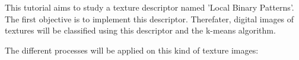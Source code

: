 \def\difficulty{1}
\begin{note}This tutorial aims to study a texture descriptor named 'Local Binary Patterns'. The first objective is to implement this descriptor. Therefater, digital images of textures will be classified using this descriptor and the k-means algorithm.  
\end{note}

\noindent The different processes will be applied on this kind of texture images:
{
	\makeatletter
	\renewcommand\fs@ruled{\def\@fs@cfont{\bfseries}\let\@fs@capt\floatc@ruled
		\def\@fs@pre{\hrule height.8pt depth0pt \kern2pt}%
		\def\@fs@post{\kern2pt\hrule\relax}%
		\def\@fs@mid{\vskip2pt}%
		\let\@fs@iftopcapt\iftrue}
	\makeatother
\begin{figure}[H]
\centering
{}
\hfill
{}
\hfill
{}
\vspace*{-5pt}
\end{figure}
}
%
